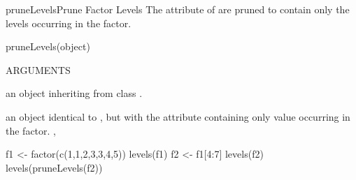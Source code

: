 \documentclass[pdftex]{article} \usepackage{url,graphicx}
\begin{document}
\begin{Helpfile}{pruneLevels}{Prune Factor Levels}
The  attribute of  are pruned to contain
only the levels occurring in the factor.
\begin{Example}
pruneLevels(object)
\end{Example}
\begin{Argument}{ARGUMENTS}
\item[\Co{object:}]
an object inheriting from class .
\end{Argument}
an object identical to , but with the 
attribute containing only value occurring in the factor.
, 
\need 15pt
\vspace{-16pt} 
\begin{Example}
f1 <- factor(c(1,1,2,3,3,4,5))
levels(f1)
f2 <- f1[4:7]
levels(f2)
levels(pruneLevels(f2))
\end{Example}
\end{Helpfile}
\end{document}
